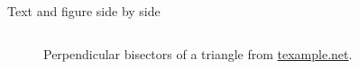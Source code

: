 \documentclass{beamer}
\begin{document}
\begin{frame}{Text and figure side by side}
\begin{columns}[c]
\begin{column}{.5\textwidth}
\begin{figure}
{
}
	\caption{Perpendicular bisectors of a triangle from
    \href{http://www.texample.net/tikz/examples/rotated-polygons/}{texample.net}.}
    \label{fig:perpendicular_bisectors}
  \end{figure}
  \end{column}
  \end{columns}
\end{frame}
\end{document}

